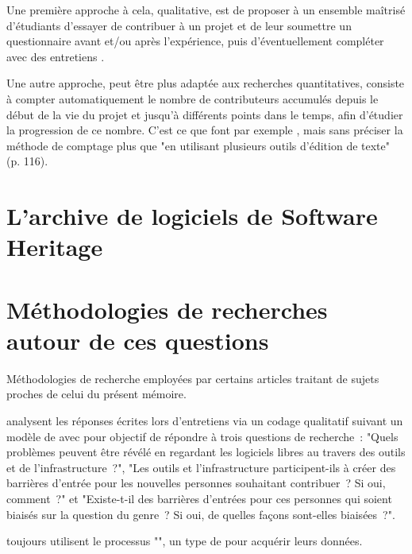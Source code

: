 Une première approche à cela, qualitative, est de proposer à un ensemble maîtrisé d'étudiants d'essayer de
contribuer à un projet et de leur soumettre un questionnaire avant et/ou après l'expérience, puis
d'éventuellement compléter avec des entretiens
\parencites{newcomers-accessibility-2016}{newcomers-onboarding-2018}[voir aussi][]{newcomers-adaptation-2005}.

Une autre approche, peut être plus adaptée aux recherches quantitatives, consiste à compter automatiquement le
nombre de contributeurs accumulés depuis le début de la vie du projet et jusqu'à différents points dans le
temps, afin d'étudier la progression de ce nombre. C'est ce que font par exemple
, mais sans préciser la méthode de comptage plus que "en utilisant
plusieurs outils d'édition de texte" (p. 116).



\section{L'archive de logiciels de Software Heritage}


\section{Méthodologies de recherches autour de ces questions}

Méthodologies de recherche employées par certains articles traitant de sujets proches de celui du présent
mémoire.

\textcite[p.~1006]{barriers-2018} analysent les réponses écrites lors d'entretiens via un codage
qualitatif suivant un modèle de  avec pour objectif de répondre à trois questions
de recherche : "Quels problèmes peuvent être révélé en regardant les logiciels libres au travers des outils et
de l'infrastructure ?", "Les outils et l'infrastructure participent-ils à créer des barrières d'entrée pour
les nouvelles personnes souhaitant contribuer ? Si oui, comment ?" et "Existe-t-il des barrières d'entrées
pour ces personnes qui soient biaisés sur la question du genre ? Si oui, de quelles façons sont-elles
biaisées ?".

\textcite[p.~1006]{barriers-2018} toujours utilisent le processus "", un type de  pour acquérir leurs données. 

